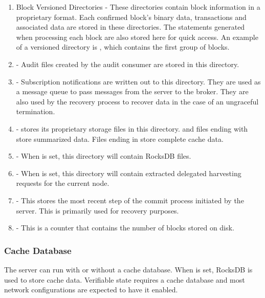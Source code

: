 \begin{enumerate}
	\item{Block Versioned Directories -
		These directories contain block information in a proprietary format.
		Each confirmed block's binary data, transactions and associated data are stored in these directories.
		The statements  generated when processing each block are also stored here for quick access.
		An example of a versioned directory is , which contains the first group of blocks.
	}
	\item{ - Audit files created by the audit consumer  are stored in this directory.}
	\item{ -
		Subscription notifications are written out to this directory.
		They are used as a message queue to pass messages from the server to the broker.
		They are also used by the recovery process to recover data in the case of an ungraceful termination.
	}
	\item{ -
		\codenamespace stores its proprietary storage files in this directory.
		 and files ending with  store summarized data.
		Files ending in  store complete cache data.
	}
	\item{ - When  is set, this directory will contain RocksDB files.}
	\item{ -
		When  is set, this directory will contain extracted delegated harvesting requests for the current node.
	}
	\item{ -
		This stores the most recent step of the commit process initiated by the server.
		This is primarily used for recovery purposes.
	}
	\item{ - This is a counter that contains the number of blocks stored on disk.}
\end{enumerate}

\subsubsection{Cache Database}

The server can run with or without a cache database.
When  is set, RocksDB is used to store cache data.
Verifiable state  requires a cache database and most network configurations are expected to have it enabled.

